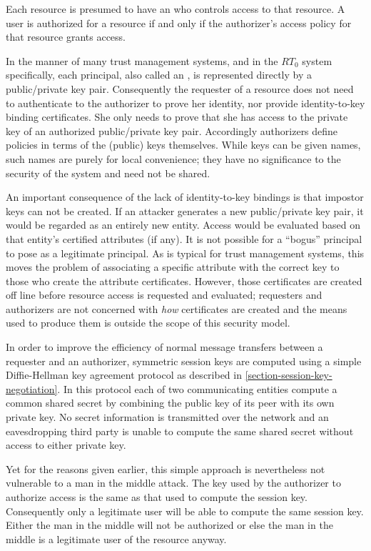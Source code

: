 Each resource is presumed to have an  who controls access to that resource.
A user is authorized for a resource if and only if the authorizer's access policy for that
resource grants access.

In the manner of many trust management systems, and in the $RT_0$ system specifically, each
principal, also called an , is represented directly by a public/private key
pair. Consequently the requester of a resource does not need to authenticate to the authorizer
to prove her identity, nor provide identity-to-key binding certificates. She only needs to prove
that she has access to the private key of an authorized public/private key pair. Accordingly
authorizers define policies in terms of the (public) keys themselves. While keys can be given
names, such names are purely for local convenience; they have no significance to the security of
the system and need not be shared.

An important consequence of the lack of identity-to-key bindings is that impostor keys can not
be created. If an attacker generates a new public/private key pair, it would be regarded as an
entirely new entity. Access would be evaluated based on that entity's certified attributes (if
any). It is not possible for a ``bogus'' principal to pose as a legitimate principal. As is
typical for trust management systems, this moves the problem of associating a specific attribute
with the correct key to those who create the attribute certificates. However, those certificates
are created off line before resource access is requested and evaluated; requesters and
authorizers are not concerned with \emph{how} certificates are created and the means used to
produce them is outside the scope of this security model.

In order to improve the efficiency of normal message transfers between a requester and an
authorizer, symmetric session keys are computed using a simple Diffie-Hellman key agreement
protocol \cite{Diffie:2006:NDC:2263321.2269104} as described in
\autoref{section-session-key-negotiation}. In this protocol each of two communicating entities
compute a common shared secret by combining the public key of its peer with its own private key.
No secret information is transmitted over the network and an eavesdropping third party is unable
to compute the same shared secret without access to either private key.

Yet for the reasons given earlier, this simple approach is nevertheless not vulnerable to a man
in the middle attack. The key used by the authorizer to authorize access is the same as that
used to compute the session key. Consequently only a legitimate user will be able to compute the
same session key. Either the man in the middle will not be authorized or else the man in the
middle is a legitimate user of the resource anyway.

